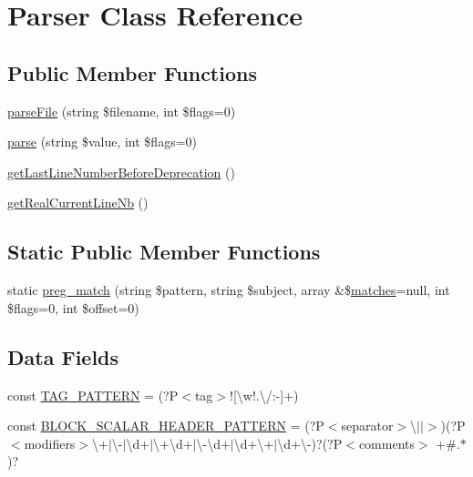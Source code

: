 \hypertarget{class_symfony_1_1_component_1_1_yaml_1_1_parser}{}\section{Parser Class Reference}
\label{class_symfony_1_1_component_1_1_yaml_1_1_parser}
\subsection*{Public Member Functions}
\begin{DoxyCompactItemize}
\item 
\mbox{\hyperlink{class_symfony_1_1_component_1_1_yaml_1_1_parser_a86235cd393547eda50a86594250d8959}{parse\+File}} (string \$filename, int \$flags=0)
\item 
\mbox{\hyperlink{class_symfony_1_1_component_1_1_yaml_1_1_parser_a6e8a026bbadb3fdcd9595ae40a5baf8e}{parse}} (string \$value, int \$flags=0)
\item 
\mbox{\hyperlink{class_symfony_1_1_component_1_1_yaml_1_1_parser_a090b240e69e3e8febfe592af209e5163}{get\+Last\+Line\+Number\+Before\+Deprecation}} ()
\item 
\mbox{\hyperlink{class_symfony_1_1_component_1_1_yaml_1_1_parser_afed732413dcd90e7e27f15f9a693a933}{get\+Real\+Current\+Line\+Nb}} ()
\end{DoxyCompactItemize}
\subsection*{Static Public Member Functions}
\begin{DoxyCompactItemize}
\item 
static \mbox{\hyperlink{class_symfony_1_1_component_1_1_yaml_1_1_parser_abcde281419fa81c2742f2340fecdfaf1}{preg\+\_\+match}} (string \$pattern, string \$subject, array \&\$\mbox{\hyperlink{_functions_8php_a8968a55c84671473daa2233e6cae65b8}{matches}}=null, int \$flags=0, int \$offset=0)
\end{DoxyCompactItemize}
\subsection*{Data Fields}
\begin{DoxyCompactItemize}
\item 
const \mbox{\hyperlink{class_symfony_1_1_component_1_1_yaml_1_1_parser_ae26b8cbd52e33c09fcaf5ccd09a21f19}{T\+A\+G\+\_\+\+P\+A\+T\+T\+E\+RN}} = \textquotesingle{}(?P$<$tag$>$!\mbox{[}\textbackslash{}w!.\textbackslash{}/\+:-\/\mbox{]}+)\textquotesingle{}
\item 
const \mbox{\hyperlink{class_symfony_1_1_component_1_1_yaml_1_1_parser_a76585a097a4e94d76ade259db4dfdfeb}{B\+L\+O\+C\+K\+\_\+\+S\+C\+A\+L\+A\+R\+\_\+\+H\+E\+A\+D\+E\+R\+\_\+\+P\+A\+T\+T\+E\+RN}} = \textquotesingle{}(?P$<$separator$>$\textbackslash{}$\vert$$\vert$$>$)(?P$<$modifiers$>$\textbackslash{}+$\vert$\textbackslash{}-\/$\vert$\textbackslash{}d+$\vert$\textbackslash{}+\textbackslash{}d+$\vert$\textbackslash{}-\/\textbackslash{}d+$\vert$\textbackslash{}d+\textbackslash{}+$\vert$\textbackslash{}d+\textbackslash{}-\/)?(?P$<$comments$>$ +\#.$\ast$)?\textquotesingle{}
\end{DoxyCompactItemize}


